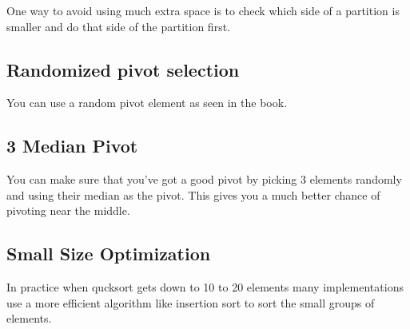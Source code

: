 \documentclass[english, 10pt]{article}
\begin{document}
One way to avoid using much extra space is to check which side of a partition
is smaller and do that side of the partition first.


\subsection{Randomized pivot selection}

You can use a random pivot element as seen in the book.

\subsection{3 Median Pivot}

You can make sure that you've got a good pivot by picking 3 elements randomly
and using their median as the pivot. This gives you a much better chance of
pivoting near the middle.

\subsection{Small Size Optimization}

In practice when qucksort gets down to 10 to 20 elements many implementations use
a more efficient algorithm like insertion sort to sort the small groups of
elements.


\end{document}
